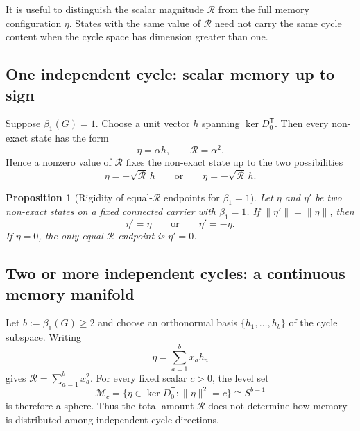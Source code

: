 \documentclass[aip,jmp,amsmath,amssymb,reprint]{revtex4-2}
\newtheorem{proposition}{Proposition}
\newcommand{\Rcal}{\mathcal{R}}
\newcommand{\kerop}{\operatorname{ker}}
\begin{document}
It is useful to distinguish the scalar magnitude $\Rcal$ from the full memory configuration $\eta$. States with the same value of $\Rcal$ need not carry the same cycle content when the cycle space has dimension greater than one.

\subsection{One independent cycle: scalar memory up to sign}

Suppose $\beta_1(G)=1$. Choose a unit vector $h$ spanning $\kerop D_0^{\mathsf T}$. Then every non-exact state has the form
\begin{equation}
\eta=\alpha h,
\qquad
\Rcal=\alpha^2.
\label{eq:beta1-one-coordinate}
\end{equation}
Hence a nonzero value of $\Rcal$ fixes the non-exact state up to the two possibilities
\begin{equation}
\eta=+\sqrt{\Rcal}\,h
\qquad\text{or}\qquad
\eta=-\sqrt{\Rcal}\,h.
\label{eq:beta1-one-two-points}
\end{equation}

\begin{proposition}[Rigidity of equal-$\Rcal$ endpoints for $\beta_1=1$]\label{prop:beta1-sourcefree-rigidity}
Let $\eta$ and $\eta'$ be two non-exact states on a fixed connected carrier with $\beta_1=1$. If $\lVert\eta'\rVert=\lVert\eta\rVert$, then
\begin{equation}
\eta'=\eta
\qquad\text{or}\qquad
\eta'=-\eta.
\label{eq:beta1-rigidity}
\end{equation}
If $\eta=0$, the only equal-$\Rcal$ endpoint is $\eta'=0$.
\end{proposition}

\subsection{Two or more independent cycles: a continuous memory manifold}

Let $b:=\beta_1(G)\ge2$ and choose an orthonormal basis $\{h_1,\ldots,h_b\}$ of the cycle subspace. Writing
\begin{equation}
\eta=\sum_{a=1}^{b}x_a h_a
\end{equation}
gives $\Rcal=\sum_{a=1}^{b}x_a^2$. For every fixed scalar $c>0$, the level set
\begin{equation}
\mathcal M_c
=\{\eta\in\kerop D_0^{\mathsf T}:\lVert\eta\rVert^2=c\}
\cong S^{b-1}
\label{eq:memory-sphere}
\end{equation}
is therefore a sphere. Thus the total amount $\Rcal$ does not determine how memory is distributed among independent cycle directions.
\end{document}
